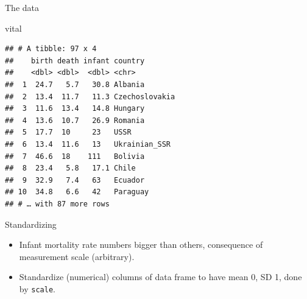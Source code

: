 \documentclass[ignorenonframetext,]{beamer}
\newenvironment{Shaded}{\begin{snugshade}}{\end{snugshade}}
\newcommand{\KeywordTok}[1]{\textcolor[rgb]{0.13,0.29,0.53}{\textbf{#1}}}
\newcommand{\NormalTok}[1]{#1}
\newcommand{\OperatorTok}[1]{\textcolor[rgb]{0.81,0.36,0.00}{\textbf{#1}}}
\newcommand{\StringTok}[1]{\textcolor[rgb]{0.31,0.60,0.02}{#1}}
\begin{document}
\begin{frame}[fragile]{The data}
\protect\hypertarget{the-data-12}{}

\begin{Shaded}
\begin{Highlighting}[]
\NormalTok{vital}
\end{Highlighting}
\end{Shaded}

\begin{verbatim}
## # A tibble: 97 x 4
##    birth death infant country       
##    <dbl> <dbl>  <dbl> <chr>         
##  1  24.7   5.7   30.8 Albania       
##  2  13.4  11.7   11.3 Czechoslovakia
##  3  11.6  13.4   14.8 Hungary       
##  4  13.6  10.7   26.9 Romania       
##  5  17.7  10     23   USSR          
##  6  13.4  11.6   13   Ukrainian_SSR 
##  7  46.6  18    111   Bolivia       
##  8  23.4   5.8   17.1 Chile         
##  9  32.9   7.4   63   Ecuador       
## 10  34.8   6.6   42   Paraguay      
## # … with 87 more rows
\end{verbatim}

\end{frame}

\begin{frame}[fragile]{Standardizing}
\protect\hypertarget{standardizing}{}

\begin{itemize}
\item
  Infant mortality rate numbers bigger than others, consequence of
  measurement scale (arbitrary).
\item
  Standardize (numerical) columns of data frame to have mean 0, SD 1,
  done by \texttt{scale}.
\end{itemize}

\begin{Shaded}
\end{Shaded}

\end{frame}
\end{document}
